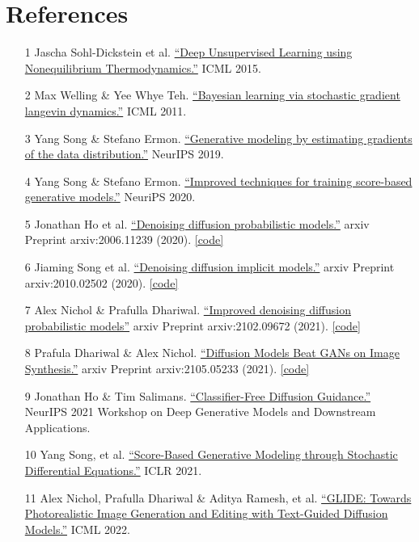 \documentclass[12pt]{article}
\begin{document}
\section{References}
\begin{itemize}
    \item [1] Jascha Sohl-Dickstein et al. \href{https://arxiv.org/abs/1503.03585}{“Deep Unsupervised Learning using Nonequilibrium Thermodynamics.”} ICML 2015.
    \item [2] Max Welling \& Yee Whye Teh. \href{https://www.stats.ox.ac.uk/~teh/research/compstats/WelTeh2011a.pdf}{“Bayesian learning via stochastic gradient langevin dynamics.”} ICML 2011.
    \item [3] Yang Song \& Stefano Ermon. \href{https://arxiv.org/abs/1907.05600}{“Generative modeling by estimating gradients of the data distribution.”} NeurIPS 2019.
    \item [4] Yang Song \& Stefano Ermon. \href{https://arxiv.org/abs/2006.09011}{“Improved techniques for training score-based generative models.”}  NeuriPS 2020.
    \item [5] Jonathan Ho et al. \href{https://arxiv.org/abs/2006.11239}{“Denoising diffusion probabilistic models.”} arxiv Preprint arxiv:2006.11239 (2020). \href{https://github.com/hojonathanho/diffusion}{[code]}
    \item [6] Jiaming Song et al. \href{https://arxiv.org/abs/2010.02502}{“Denoising diffusion implicit models.”} arxiv Preprint arxiv:2010.02502 (2020). \href{https://github.com/ermongroup/ddim}{[code]}
    \item [7] Alex Nichol \& Prafulla Dhariwal. \href{https://arxiv.org/abs/2102.09672}{“Improved denoising diffusion probabilistic models”} arxiv Preprint arxiv:2102.09672 (2021). \href{https://github.com/openai/improved-diffusion}{[code]}
    \item [8] Prafula Dhariwal \& Alex Nichol. \href{https://arxiv.org/abs/2105.05233}{“Diffusion Models Beat GANs on Image Synthesis.”} arxiv Preprint arxiv:2105.05233 (2021). \href{https://github.com/openai/guided-diffusion}{[code]}
    \item [9] Jonathan Ho \& Tim Salimans. \href{https://arxiv.org/abs/2207.12598}{“Classifier-Free Diffusion Guidance.”} NeurIPS 2021 Workshop on Deep Generative Models and Downstream Applications.
    \item [10] Yang Song, et al. \href{https://openreview.net/forum?id=PxTIG12RRHS}{“Score-Based Generative Modeling through Stochastic Differential Equations.”} ICLR 2021.
    \item [11] Alex Nichol, Prafulla Dhariwal \& Aditya Ramesh, et al. \href{https://arxiv.org/abs/2112.10741}{“GLIDE: Towards Photorealistic Image Generation and Editing with Text-Guided Diffusion Models.”} ICML 2022.

\end{itemize}
\end{document}
